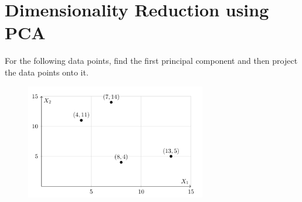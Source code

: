 \section{Dimensionality Reduction using PCA}
For the following data points, find the first principal component and then project the data
points onto it.
\begin{figure}[H]
    \centering
    \includegraphics[width=0.7\textwidth]{chart1.png}
\end{figure}
